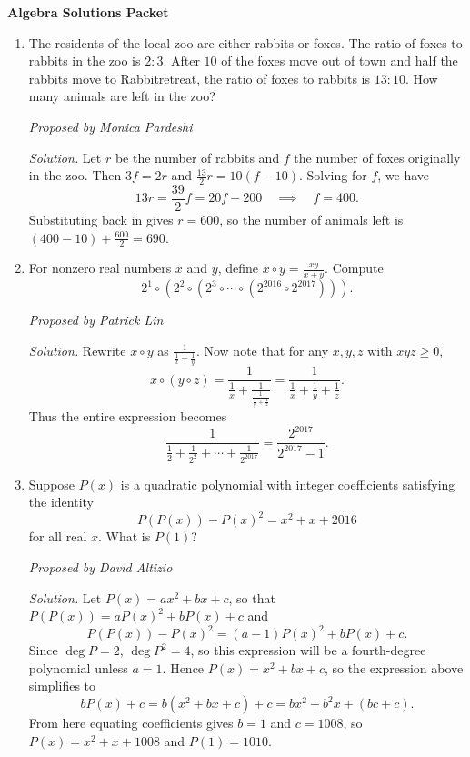 \documentclass[10pt]{article}
\newcommand{\proposed}[1]
{
\vspace{5pt}
\noindent\textit{Proposed by #1}
}
\newcommand{\solution}
{
\vspace{5pt}
\noindent\textit{Solution.}\qquad
}
\begin{document}
\begin{center}
\huge\textbf{Algebra Solutions Packet}\normalsize

\vspace{3pt}
\end{center}

\begin{enumerate}

\item The residents of the local zoo are either rabbits or foxes. The ratio of foxes to rabbits in the zoo is $2:3$. After $10$ of the foxes move out of town and half the rabbits move to Rabbitretreat, the ratio of foxes to rabbits is $13:10$. How many animals are left in the zoo?

\proposed{Monica Pardeshi}

\solution Let $r$ be the number of rabbits and $f$ the number of foxes originally in the zoo.  Then $3f=2r$ and $\tfrac{13}2r = 10(f-10)$.  Solving for $f$, we have \[13r = \dfrac{39}2f = 20f - 200\quad\implies\quad f = 400.\] Substituting back in gives $r=600$, so the number of animals left is $(400-10)+\tfrac{600}2=\boxed{690}$.

\item For nonzero real numbers $x$ and $y$, define $x\circ y = \tfrac{xy}{x+y}$.  Compute \[2^1\circ \left(2^2\circ \left(2^3\circ\cdots\circ\left(2^{2016}\circ 2^{2017}\right)\right)\right).\]

\proposed{Patrick Lin}

\solution Rewrite $x\circ y$ as $\frac{1}{\frac1x+\frac1y}$.  Now note that for any $x,y,z$ with $xyz\geq 0$, \[x\circ (y\circ z) = \dfrac{1}{\frac1x+\frac1{\frac1{\frac1y+\frac1z}}} = \frac{1}{\frac1x+\frac1y+\frac1z}.\] Thus the entire expression becomes \[\dfrac{1}{\frac12+\frac1{2^2}+\cdots+\frac1{2^{2017}}} = \boxed{\dfrac{2^{2017}}{2^{2017}-1}}.\]

\item Suppose $P(x)$ is a quadratic polynomial with integer coefficients satisfying the identity \[P(P(x)) - P(x)^2 = x^2+x+2016\] for all real $x$.  What is $P(1)$?

\proposed{David Altizio}

\solution Let $P(x) = ax^2+bx+c$, so that $P(P(x)) = aP(x)^2+bP(x) + c$ and \[P(P(x)) - P(x)^2 = (a-1)P(x)^2+bP(x) + c.\] Since $\deg P = 2$, $\deg P^2 = 4$, so this expression will be a fourth-degree polynomial unless $a=1$.  Hence $P(x) = x^2+bx+c$, so the expression above simplifies to \[bP(x) + c = b(x^2+bx+c) + c = bx^2+b^2x+(bc+c).\] From here equating coefficients gives $b=1$ and $c=1008$, so $P(x)=x^2+x+1008$ and $P(1) = \boxed{1010}$.


\end{enumerate}
\end{document}
